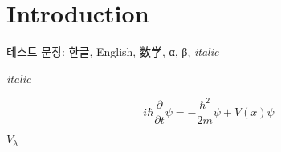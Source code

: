 \documentclass[a4paper,12pt]{article}
\begin{document}
\section{Introduction}
테스트 문장: 한글, English, 数学, α, β, \textit{italic} 

\textit{italic}

\[
    i \hbar  \frac{\partial}{\partial t} \psi = - \frac{\hbar ^{2}}{2m} \psi + V(x) \psi  
\]

\(V_{\lambda } \) 
\end{document}
